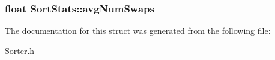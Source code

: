 \subsubsection[{\texorpdfstring{avg\+Num\+Swaps}{avgNumSwaps}}]{\setlength{\rightskip}{0pt plus 5cm}float Sort\+Stats\+::avg\+Num\+Swaps}\hypertarget{struct_sort_stats_a0ce1570721d9b686f9fa0adb164689df}{}\label{struct_sort_stats_a0ce1570721d9b686f9fa0adb164689df}


The documentation for this struct was generated from the following file\+:\begin{DoxyCompactItemize}
\item 
\hyperlink{_sorter_8h}{Sorter.\+h}\end{DoxyCompactItemize}
